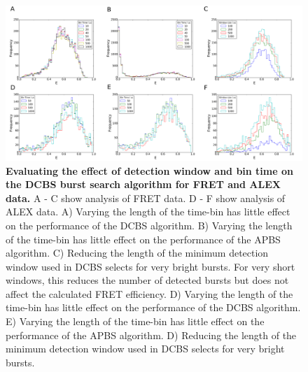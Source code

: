 \begin{figure}[!ht]
   \begin{center}
      \includegraphics*[clip=true, width=6in]{pyFRET/window_effect.pdf}
      \caption{{\bf Evaluating the effect of detection window and bin time on the DCBS burst search algorithm for FRET and ALEX data.} A - C show analysis of FRET data. D - F show analysis of ALEX data. A) Varying the length of the time-bin has little effect on the performance of the DCBS algorithm. B) Varying the length of the time-bin has little effect on the performance of the APBS algorithm. C) Reducing the length of the minimum detection window used in DCBS selects for very bright bursts. For very short windows, this reduces the number of detected bursts but does not affect the calculated FRET efficiency. D) Varying the length of the time-bin has little effect on the performance of the DCBS algorithm. E) Varying the length of the time-bin has little effect on the performance of the APBS algorithm. D) Reducing the length of the minimum detection window used in DCBS selects for very bright bursts.}
      \label{fig:fig7_binning}
   \end{center}
\end{figure}

